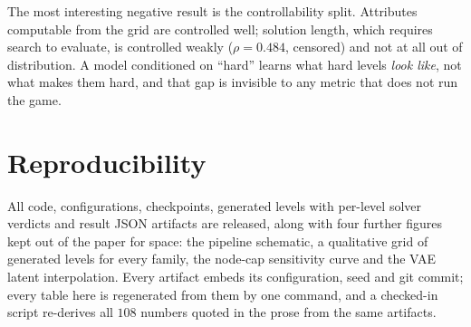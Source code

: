 \documentclass[conference]{IEEEtran}
\begin{document}
The most interesting negative result is the controllability split. Attributes
computable from the grid are controlled well; solution length, which requires
search to evaluate, is controlled weakly ($\rho = 0.484$, censored) and not at
all out of distribution. A model conditioned on ``hard'' learns what hard levels
\emph{look like}, not what makes them hard, and that gap is invisible to any
metric that does not run the game.

\section*{Reproducibility}

All code, configurations, checkpoints, generated levels with per-level solver
verdicts and result JSON artifacts are released, along with four further figures
kept out of the paper for space: the pipeline schematic, a qualitative grid of
generated levels for every family, the node-cap sensitivity curve and the VAE
latent interpolation. Every artifact embeds its
configuration, seed and git commit; every table here is regenerated from them by
one command, and a checked-in script re-derives all $108$ numbers quoted in the
prose from the same artifacts.



\end{document}
